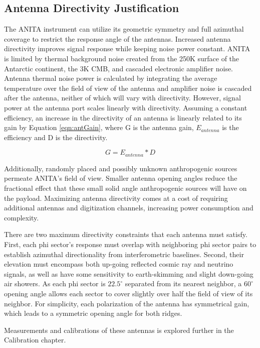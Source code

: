 	\subsection{Antenna Directivity Justification}
		The ANITA instrument can utilize its geometric symmetry and full azimuthal coverage to restrict the response angle of the antennas. Increased antenna directivity improves signal response while keeping noise power constant.  ANITA is limited by thermal background noise created from the 250K surface of the Antarctic continent, the 3K CMB, and cascaded electronic amplifier noise.  Antenna thermal noise power is calculated by integrating the average temperature over the field of view of the antenna and amplifier noise is cascaded after the antenna, neither of which will vary with directivity.  However, signal power at the antenna port scales linearly with directivity. Assuming a constant efficiency, an increase in the directivity of an antenna is linearly related to its gain by Equation \ref{eqn:antGain}, where G is the antenna gain, $E_{antenna}$ is the efficiency and D is the directivity.
		
\begin{equation}
	\label{eqn:antGain}
	G = E_{antenna} * D
\end{equation}

		
		 Additionally, randomly placed and possibly unknown anthropogenic sources permeate ANITA's field of view.  Smaller antenna opening angles reduce the fractional effect that these small solid angle anthropogenic sources will have on the payload.  Maximizing antenna directivity comes at a cost of requiring additional antennas and digitization channels, increasing power consumption and complexity.
		
		There are two maximum directivity constraints that each antenna must satisfy.  First, each phi sector's response must overlap with neighboring phi sector pairs to establish azimuthal directionality from interferometric baselines. Second, their elevation must encompass both up-going reflected cosmic ray and neutrino signals, as well as have some sensitivity to earth-skimming and slight down-going air showers.  As each phi sector is $22.5^{\circ}$ separated from its nearest neighbor, a $60^{\circ}$ opening angle allows each sector to cover slightly over half the field of view of its neighbor.  For simplicity, each polarization of the antenna has symmetrical gain, which leads to a symmetric opening angle for both ridges.
		
	Measurements and calibrations of these antennas is explored further in the Calibration chapter.
	
